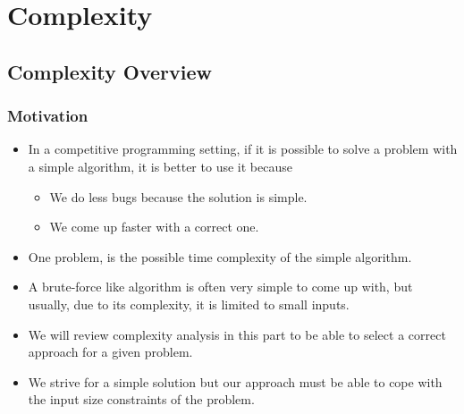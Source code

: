 \documentclass{beamer}
\begin{document}
\section{Complexity}

\subsection{Complexity Overview}

\begin{frame}%
\frametitle{Motivation}

\begin{itemize}
\item In a competitive programming setting, if it is possible to solve a problem with a simple algorithm, it is
better to use it because
\begin{itemize}
\vspace{0.05cm}
\item<1-> We do less bugs because the solution is simple.
\vspace{0.05cm}
\item<1-> We come up faster with a correct one.
\end{itemize}

\vspace{0.1cm}

\item<2-> One problem, is the possible time complexity of the simple algorithm.

\vspace{0.1cm}

\item<3-> A brute-force like algorithm
is often very simple to come up with, but usually, due to its complexity, it is limited to small inputs.\\

\vspace{0.1cm}

\item<4-> We will review complexity analysis in this part to be able to select a correct approach for a given problem.\\

\vspace{0.1cm}

\item<5-> We strive for a simple solution but our approach must be able to cope
with the input size constraints of the problem.

\end{itemize}

\end{frame}
\end{document}

